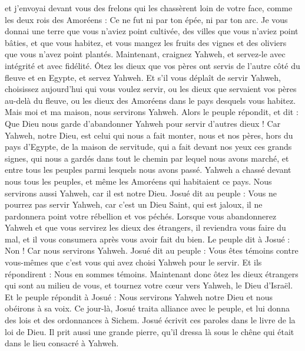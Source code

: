 \begin{multicols}{2}
et j’envoyai devant vous des frelons qui les chassèrent loin de votre face, comme les deux rois des Amoréens : Ce ne fut ni par ton épée, ni par ton arc.
Je vous donnai une terre que vous n’aviez point cultivée, des villes que vous n’aviez point bâties, et que vous habitez, et vous mangez les fruits des vignes et des oliviers que vous n’avez point plantés.
Maintenant, craignez Yahweh, et servez-le avec intégrité et avec fidélité. Ôtez les dieux que vos pères ont servis de l’autre côté du fleuve et en Egypte, et servez Yahweh.
Et s’il vous déplaît de servir Yahweh, choisissez aujourd’hui qui vous voulez servir, ou les dieux que servaient vos pères au-delà du fleuve, ou les dieux des Amoréens dans le pays desquels vous habitez. Mais moi et ma maison, nous servirons Yahweh.
Alors le peuple répondit, et dit : Que Dieu nous garde d’abandonner Yahweh pour servir d’autres dieux !
Car Yahweh, notre Dieu, est celui qui nous a fait monter, nous et nos pères, hors du pays d’Egypte, de la maison de servitude, qui a fait devant nos yeux ces grands signes, qui nous a gardés dans tout le chemin par lequel nous avons marché, et entre tous les peuples parmi lesquels nous avons passé.
Yahweh a chassé devant nous tous les peuples, et même les Amoréens qui habitaient ce pays. Nous servirons aussi Yahweh, car il est notre Dieu.
Josué dit au peuple : Vous ne pourrez pas servir Yahweh, car c’est un Dieu Saint, qui est jaloux, il ne pardonnera point votre rébellion et vos péchés.
Lorsque vous abandonnerez Yahweh et que vous servirez les dieux des étrangers, il reviendra vous faire du mal, et il vous consumera après vous avoir fait du bien.
Le peuple dit à Josué : Non ! Car nous servirons Yahweh.
Josué dit au peuple : Vous êtes témoins contre vous-mêmes que c’est vous qui avez choisi Yahweh pour le servir. Et ils répondirent : Nous en sommes témoins.
Maintenant donc ôtez les dieux étrangers qui sont au milieu de vous, et tournez votre cœur vers Yahweh, le Dieu d’Israël.
Et le peuple répondit à Josué : Nous servirons Yahweh notre Dieu et nous obéirons à sa voix.
Ce jour-là, Josué traita alliance avec le peuple, et lui donna des lois et des ordonnances à Sichem.
Josué écrivit ces paroles dans le livre de la loi de Dieu. Il prit aussi une grande pierre, qu’il dressa là sous le chêne qui était dans le lieu consacré à Yahweh.

\end{multicols}

